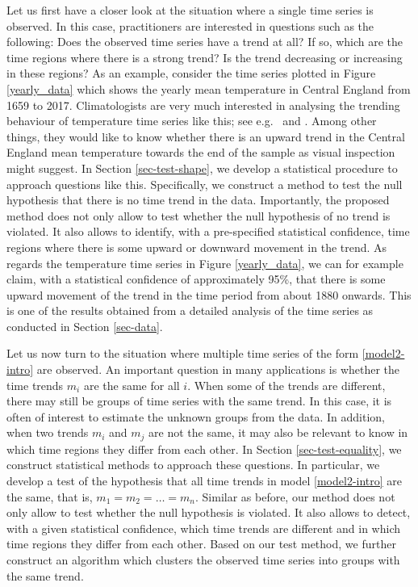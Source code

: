Let us first have a closer look at the situation where a single time series is observed. In this case, practitioners are interested in questions such as the following: Does the observed time series have a trend at all? If so, which are the time regions where there is a strong trend? Is the trend decreasing or increasing in these regions? As an example, consider the time series plotted in Figure \ref{yearly_data} which shows the yearly mean temperature in Central England from 1659 to 2017. Climatologists are very much interested in analysing the trending behaviour of temperature time series like this; see e.g.\ \cite{Benner1999} and \cite{Rahmstorf2017}. Among other things, they would like to know whether there is an upward trend in the Central England mean temperature towards the end of the sample as visual inspection might suggest. In Section \ref{sec-test-shape}, we develop a statistical procedure to approach questions like this. Specifically, we construct a method to test the null hypothesis that there is no time trend in the data. Importantly, the proposed method does not only allow to test whether the null hypothesis of no trend is violated. It also allows to identify, with a pre-specified statistical confidence, time regions where there is some upward or downward movement in the trend. As regards the temperature time series in Figure \ref{yearly_data}, we can for example claim, with a statistical confidence of approximately 95\%, that there is some upward movement of the trend in the time period from about 1880 onwards. This is one of the results obtained from a detailed analysis of the time series as conducted in Section \ref{sec-data}. 


Let us now turn to the situation where multiple time series of the form \eqref{model2-intro} are observed. An important question in many applications is whether the time trends $m_i$ are the same for all $i$. When some of the trends are different, there may still be groups of time series with the same trend. In this case, it is often of interest to estimate the unknown groups from the data. In addition, when two trends $m_i$ and $m_j$ are not the same, it may also be relevant to know in which time regions they differ from each other. In Section \ref{sec-test-equality}, we construct statistical methods to approach these questions. In particular, we develop a test of the hypothesis that all time trends in model \eqref{model2-intro} are the same, that is, $m_1 = m_2 = \ldots = m_n$. Similar as before, our method does not only allow to test whether the null hypothesis is violated. It also allows to detect, with a given statistical confidence, which time trends are different and in which time regions they differ from each other. Based on our test method, we further construct an algorithm which clusters the observed time series into groups with the same trend. 


